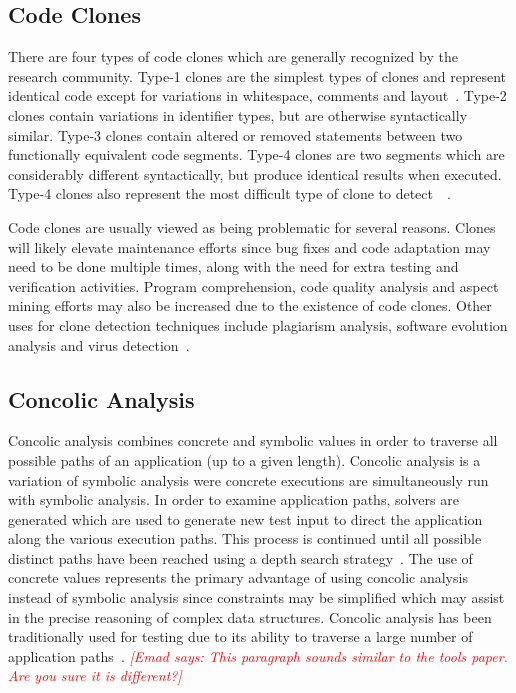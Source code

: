 \documentclass{sig-alternate}
\newcommand{\emad}[1]{\textcolor{red}{{\it [Emad says: #1]}}}
\begin{document}
\subsection{Code Clones}

There are four types of code clones which are generally recognized by the research community. Type-1 clones are the simplest types of clones and represent identical code except for variations in whitespace, comments and layout~\cite{4288192}. Type-2 clones contain variations in identifier types, but are otherwise syntactically similar. Type-3 clones contain altered or removed statements between two functionally equivalent code segments. Type-4 clones are two segments which are considerably different syntactically, but produce identical results when executed. Type-4 clones also represent the most difficult type of clone to detect~\cite{Gold:2010:ICC:1808901.1808916}~\cite{Dang:2012:XTC:2420950.2421004}.

Code clones are usually viewed as being problematic for several reasons. Clones will likely elevate maintenance efforts since bug fixes and code adaptation may need to be done multiple times, along with the need for extra testing and verification activities. Program comprehension, code quality analysis and aspect mining efforts  may also be increased due to the existence of code clones. Other uses for clone detection techniques include plagiarism analysis, software evolution analysis and virus detection~\cite{Roy:2009:CEC:1530898.1531101}.



\subsection{Concolic Analysis}

Concolic analysis combines concrete and symbolic values in order to traverse all possible paths of an application (up to a given length). Concolic analysis is a variation of symbolic analysis were concrete executions are simultaneously run with symbolic analysis. In order to examine application paths, solvers are generated which are used to generate new test input to direct the application along the various execution paths. This process is continued until all possible distinct paths have been reached using a depth search strategy~\cite{Sen:2005:CCU:1081706.1081750}. The use of concrete values represents the primary advantage of using concolic analysis instead of symbolic analysis since constraints may be simplified which may assist in the precise reasoning of complex data structures. Concolic analysis has been traditionally used for testing due to its ability to traverse a large number of application paths~\cite{Majumdar:2007:HCT:1248820.1248874}. \emad{This paragraph sounds similar to the tools paper. Are you sure it is different?}
\end{document}
